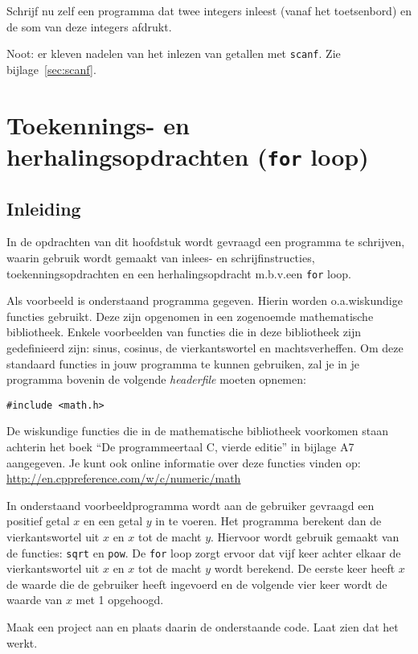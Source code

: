 \documentclass[a4paper,10pt,fleqn,twoside]{article}
\begin{document}
Schrijf nu zelf een programma dat twee integers inleest (vanaf het toetsenbord) en de som van deze integers afdrukt.

Noot: er kleven nadelen van het inlezen van getallen met \lstinline|scanf|. Zie bijlage~\ref{sec:scanf}.
\section{Toekennings- en herhalingsopdrachten (\texttt{for} loop)}

\subsection{Inleiding}

In de opdrachten van dit hoofdstuk wordt gevraagd een programma te schrijven, waarin gebruik wordt gemaakt van inlees- en schrijfinstructies, toekenningsopdrachten en een herhalingsopdracht m.b.v.\@ een \lstinline|for| loop. 

Als voorbeeld is onderstaand programma gegeven. Hierin worden o.a.\@ wiskundige functies gebruikt. Deze zijn opgenomen in een zogenoemde mathematische bibliotheek. Enkele voorbeelden van functies die in deze bibliotheek zijn gedefinieerd zijn: sinus, cosinus, de vierkantswortel en machtsverheffen. Om deze standaard functies in jouw programma te kunnen gebruiken, zal je in je programma bovenin de volgende \textsl{headerfile} moeten opnemen: 

\begin{lstlisting}
#include <math.h>
\end{lstlisting}

De wiskundige functies die in de mathematische bibliotheek voorkomen staan achterin het boek “De programmeertaal C, vierde editie” in bijlage A7 aangegeven. Je kunt ook online informatie over deze functies vinden op: \url{http://en.cppreference.com/w/c/numeric/math} 

In onderstaand voorbeeldprogramma wordt aan de gebruiker gevraagd een positief getal $x$ en een getal $y$ in te voeren. Het programma berekent dan de vierkantswortel uit $x$ en $x$ tot de macht $y$. Hiervoor wordt gebruik gemaakt van de functies: \lstinline|sqrt| en \lstinline|pow|. De \lstinline|for| loop zorgt ervoor dat vijf keer achter elkaar de vierkantswortel uit $x$ en $x$ tot de macht $y$ wordt berekend. De eerste keer heeft $x$ de waarde die de gebruiker heeft ingevoerd en de volgende vier keer wordt de waarde van $x$ met 1 opgehoogd.

Maak een project aan en plaats daarin de onderstaande code. Laat zien dat het werkt.
\end{document}
